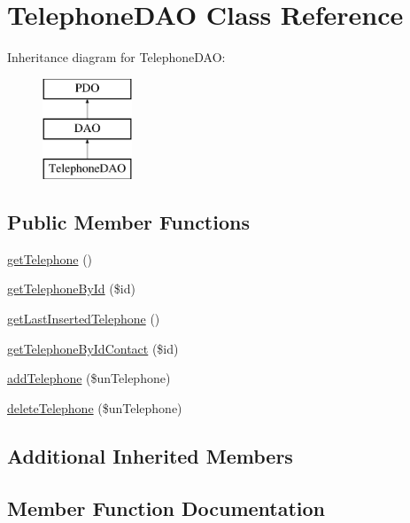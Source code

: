 \hypertarget{class_telephone_d_a_o}{}\section{Telephone\+D\+AO Class Reference}
\label{class_telephone_d_a_o}
Inheritance diagram for Telephone\+D\+AO\+:\begin{figure}[H]
\begin{center}
\leavevmode
\includegraphics[height=3.000000cm]{class_telephone_d_a_o}
\end{center}
\end{figure}
\subsection*{Public Member Functions}
\begin{DoxyCompactItemize}
\item 
\hyperlink{class_telephone_d_a_o_a326c966f9bae22a950b35abec70bf2d3}{get\+Telephone} ()
\item 
\hyperlink{class_telephone_d_a_o_a3be5ef02fb474a86c4cd98fab3209054}{get\+Telephone\+By\+Id} (\$id)
\item 
\hyperlink{class_telephone_d_a_o_a7f4765e802ab0f40f460d25f30e55380}{get\+Last\+Inserted\+Telephone} ()
\item 
\hyperlink{class_telephone_d_a_o_a126ab0b580702ce011115963a20a8e80}{get\+Telephone\+By\+Id\+Contact} (\$id)
\item 
\hyperlink{class_telephone_d_a_o_aa31d06e00a79ee603cf2f6e07802a9b7}{add\+Telephone} (\$un\+Telephone)
\item 
\hyperlink{class_telephone_d_a_o_af27c1e07fd169c60283371866f9f198f}{delete\+Telephone} (\$un\+Telephone)
\end{DoxyCompactItemize}
\subsection*{Additional Inherited Members}


\subsection{Member Function Documentation}
\mbox{\label{class_telephone_d_a_o_aa31d06e00a79ee603cf2f6e07802a9b7}} 
